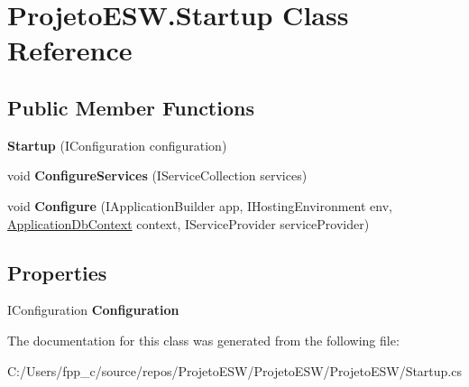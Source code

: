 \hypertarget{class_projeto_e_s_w_1_1_startup}{}\section{Projeto\+E\+S\+W.\+Startup Class Reference}
\label{class_projeto_e_s_w_1_1_startup}
\subsection*{Public Member Functions}
\begin{DoxyCompactItemize}
\item 
\mbox{\label{class_projeto_e_s_w_1_1_startup_a3a39dd52309d171068dfed592eed10e9}} 
{\bfseries Startup} (I\+Configuration configuration)
\item 
\mbox{\label{class_projeto_e_s_w_1_1_startup_a15ed480a0aa82d5d8ee61923d56e3f22}} 
void {\bfseries Configure\+Services} (I\+Service\+Collection services)
\item 
\mbox{\label{class_projeto_e_s_w_1_1_startup_a7e24dda2a325795df70b64b5cdadc918}} 
void {\bfseries Configure} (I\+Application\+Builder app, I\+Hosting\+Environment env, \mbox{\hyperlink{class_projeto_e_s_w_1_1_data_1_1_application_db_context}{Application\+Db\+Context}} context, I\+Service\+Provider service\+Provider)
\end{DoxyCompactItemize}
\subsection*{Properties}
\begin{DoxyCompactItemize}
\item 
\mbox{\label{class_projeto_e_s_w_1_1_startup_a2e6abf7d8ba26e2ffb481df0af9ebad9}} 
I\+Configuration {\bfseries Configuration}
\end{DoxyCompactItemize}


The documentation for this class was generated from the following file\+:\begin{DoxyCompactItemize}
\item 
C\+:/\+Users/fpp\+\_\+c/source/repos/\+Projeto\+E\+S\+W/\+Projeto\+E\+S\+W/\+Projeto\+E\+S\+W/Startup.\+cs\end{DoxyCompactItemize}
